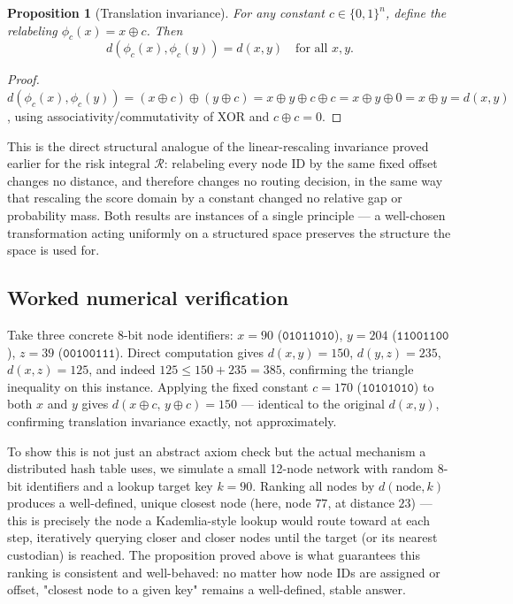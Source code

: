 \documentclass[10pt,journal,compsoc]{IEEEtran}
\newtheorem{proposition}{Proposition}
\begin{document}
\begin{proposition}[Translation invariance]
For any constant $c \in \{0,1\}^n$, define the relabeling $\phi_c(x) = x \oplus c$. Then
\begin{equation}
    d(\phi_c(x), \phi_c(y)) = d(x,y) \quad \text{for all } x,y.
\end{equation}
\end{proposition}
\begin{proof}
$d(\phi_c(x),\phi_c(y)) = (x\oplus c)\oplus(y\oplus c) = x\oplus y \oplus c \oplus c = x \oplus y \oplus 0 = x\oplus y = d(x,y)$, using associativity/commutativity of XOR and $c\oplus c = 0$.
\end{proof}
This is the direct structural analogue of the linear-rescaling invariance proved earlier for the risk integral $\mathcal{R}$: relabeling every node ID by the same fixed offset changes no distance, and therefore changes no routing decision, in the same way that rescaling the score domain by a constant changed no relative gap or probability mass. Both results are instances of a single principle — a well-chosen transformation acting uniformly on a structured space preserves the structure the space is used for.

\subsection{Worked numerical verification}
Take three concrete 8-bit node identifiers: $x=90$ ($\texttt{01011010}$), $y=204$ ($\texttt{11001100}$), $z=39$ ($\texttt{00100111}$). Direct computation gives $d(x,y)=150$, $d(y,z)=235$, $d(x,z)=125$, and indeed $125 \le 150+235=385$, confirming the triangle inequality on this instance. Applying the fixed constant $c=170$ ($\texttt{10101010}$) to both $x$ and $y$ gives $d(x\oplus c,\,y\oplus c) = 150$ — identical to the original $d(x,y)$, confirming translation invariance exactly, not approximately.

To show this is not just an abstract axiom check but the actual mechanism a distributed hash table uses, we simulate a small 12-node network with random 8-bit identifiers and a lookup target key $k=90$. Ranking all nodes by $d(\text{node}, k)$ produces a well-defined, unique closest node (here, node $77$, at distance $23$) — this is precisely the node a Kademlia-style lookup would route toward at each step, iteratively querying closer and closer nodes until the target (or its nearest custodian) is reached. The proposition proved above is what guarantees this ranking is consistent and well-behaved: no matter how node IDs are assigned or offset, "closest node to a given key" remains a well-defined, stable answer.
\end{document}

